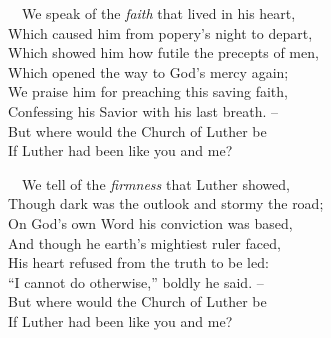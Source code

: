 \documentclass[
]{book}
\begin{document}
~~We speak of the \emph{faith} that lived in his heart,\\
\hspace*{0.333em}\hspace*{0.333em}Which caused him from popery's night to depart,\\
\hspace*{0.333em}\hspace*{0.333em}Which showed him how futile the precepts of men,\\
\hspace*{0.333em}\hspace*{0.333em}Which opened the way to God's mercy again;\\
\hspace*{0.333em}\hspace*{0.333em}We praise him for preaching this saving faith,\\
\hspace*{0.333em}\hspace*{0.333em}Confessing his Savior with his last breath. --\\
\hspace*{0.333em}\hspace*{0.333em}But where would the Church of Luther be\\
\hspace*{0.333em}\hspace*{0.333em}If Luther had been like you and me?

~~We tell of the \emph{firmness} that Luther showed,\\
\hspace*{0.333em}\hspace*{0.333em}Though dark was the outlook and stormy the road;\\
\hspace*{0.333em}\hspace*{0.333em}On God's own Word his conviction was based,\\
\hspace*{0.333em}\hspace*{0.333em}And though he earth's mightiest ruler faced,\\
\hspace*{0.333em}\hspace*{0.333em}His heart refused from the truth to be led:\\
\hspace*{0.333em}\hspace*{0.333em}``I cannot do otherwise,'' boldly he said. --\\
\hspace*{0.333em}\hspace*{0.333em}But where would the Church of Luther be\\
\hspace*{0.333em}\hspace*{0.333em}If Luther had been like you and me?
\end{document}
